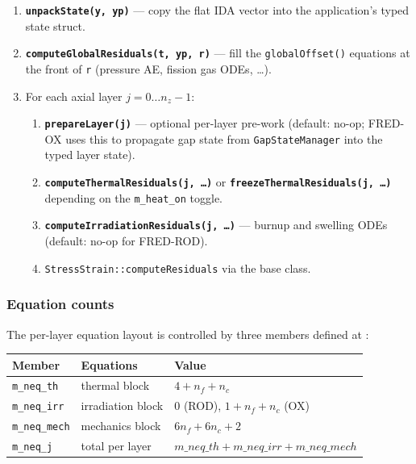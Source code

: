 \documentclass[11pt,a4paper]{article}
\begin{document}
\begin{enumerate}
  \item \textbf{\texttt{unpackState(y, yp)}} — copy the flat IDA vector into the application's typed state struct.
  \item \textbf{\texttt{computeGlobalResiduals(t, yp, r)}} — fill the \texttt{globalOffset()} equations at the front of \texttt{r} (pressure AE, fission gas ODEs, \ldots).
  \item For each axial layer $j = 0 \ldots n_z - 1$:
        \begin{enumerate}
          \item \textbf{\texttt{prepareLayer(j)}} — optional per-layer pre-work (default: no-op; FRED-OX uses this to propagate gap state from \texttt{GapStateManager} into the typed layer state).
          \item \textbf{\texttt{computeThermalResiduals(j, \ldots)}} or \textbf{\texttt{freezeThermalResiduals(j, \ldots)}} depending on the \texttt{m\_heat\_on} toggle.
          \item \textbf{\texttt{computeIrradiationResiduals(j, \ldots)}} — burnup and swelling ODEs (default: no-op for FRED-ROD).
          \item \texttt{StressStrain::computeResiduals} via the base class.
        \end{enumerate}
\end{enumerate}

\subsubsection*{Equation counts}

The per-layer equation layout is controlled by three members defined at :
\begin{center}
\begin{tabular}{lll}
  \toprule
  Member & Equations & Value \\
  \midrule
  \texttt{m\_neq\_th}   & thermal block   & $4 + n_f + n_c$ \\
  \texttt{m\_neq\_irr}  & irradiation block & $0$ (ROD), $1 + n_f + n_c$ (OX) \\
  \texttt{m\_neq\_mech} & mechanics block & $6 n_f + 6 n_c + 2$ \\
  \texttt{m\_neq\_j}    & total per layer & $m\_neq\_th + m\_neq\_irr + m\_neq\_mech$ \\
  \bottomrule
\end{tabular}
\end{center}
\end{document}
